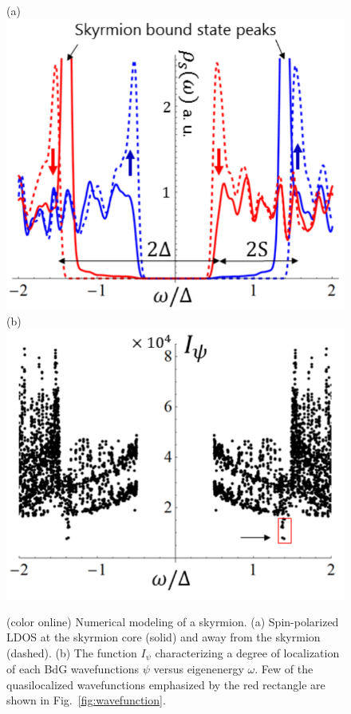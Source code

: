 \documentclass[twocolumn,showpacs,floatfix,longbibliography]{revtex4-1}
\begin{document}
\begin{figure} \centering
	(a)\includegraphics[width=0.7\linewidth]{fig3a} \\
	(b)\includegraphics[width=0.7\linewidth]{fig3b}
	\caption{(color online) Numerical modeling of a skyrmion. (a) Spin-polarized LDOS at the skyrmion core (solid) and away from the skyrmion (dashed).  (b) The function $I_\psi$ characterizing a degree of localization of each BdG wavefunctions $\psi$ versus eigenenergy $\omega$. Few of the quasilocalized wavefunctions emphasized by the red rectangle are shown in Fig.~\ref{fig:wavefunction}.} \label{fig:LDOSNumerics}
\end{figure}


\end{document}
